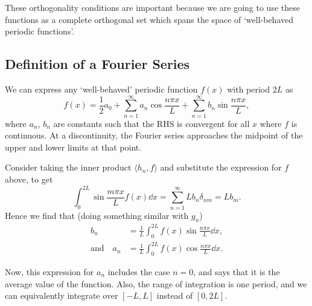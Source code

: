 \documentclass[a4paper]{scrartcl}
\begin{document}
These orthogonality conditions are important because we are going to use these functions as a complete orthogonal set which spans the space of `well-behaved periodic functions'.


\subsection{Definition of a Fourier Series}

We can express any `well-behaved' periodic function $f(x)$ with period $2L$ as
$$
f(x)=\frac{1}{2} a_{0}+\sum_{n=1}^{\infty} a_{n} \cos \frac{n \pi x}{L}+\sum_{n=1}^{\infty} b_{n} \sin \frac{n \pi x}{L},
$$
where $a_n$, $b_n$ are constants such that the RHS is convergent for all $x$ where $f$ is continuous. At a discontinuity, the Fourier series approaches the midpoint of the upper and lower limits at that point.

Consider taking the inner product $\langle h_n, f\rangle$ and substitute the expression for $f$ above, to get
$$
   \int_0^{2L} \sin \frac{m\pi x}{L} f(x) \dd x = \sum_{n = 1}^{\infty} L b_n \delta_{nm} = Lb_m.
$$
Hence we find that (doing something similar with $g_n$)
\begin{align*}
   b_n &= \frac{1}{L}\int_0^{2L} f(x) \sin \frac{n \pi x}{L} \dd x, \\
    \text{and} \quad a_n &= \frac{1}{L}\int_0^{2L} f(x) \cos \frac{n \pi x}{L} \dd x.
\end{align*}

Now, this expression for $a_n$ includes the case $n = 0$, and says that it is the average value of the function. Also, the range of integration is one period, and we can equivalently integrate over $[-L, L]$ instead of $[0, 2L]$.
\end{document}
